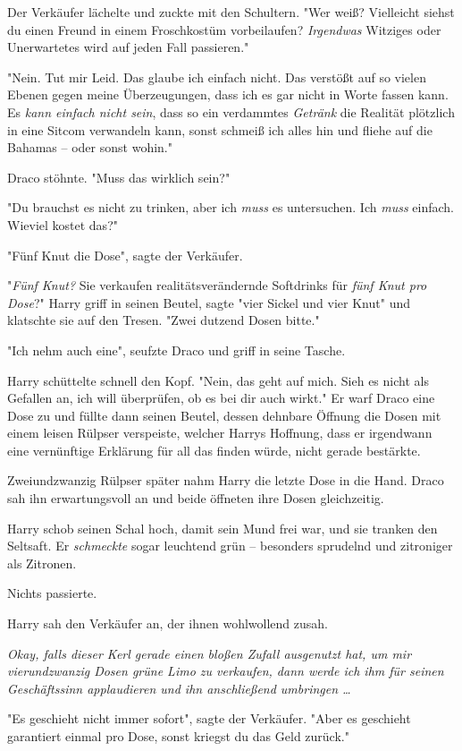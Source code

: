 {Der Verkäufer lächelte und zuckte mit den Schultern. "Wer weiß? Vielleicht siehst du einen Freund in einem Froschkostüm vorbeilaufen? \emph{Irgendwas} Witziges oder Unerwartetes wird auf jeden Fall passieren."

"Nein. Tut mir Leid. Das glaube ich einfach nicht. Das verstößt auf so vielen Ebenen gegen meine Überzeugungen, dass ich es gar nicht in Worte fassen kann. Es \emph{kann einfach nicht sein}, dass so ein verdammtes \emph{Getränk} die Realität plötzlich in eine Sitcom verwandeln kann, sonst schmeiß ich alles hin und fliehe auf die Bahamas -- oder sonst wohin."

Draco stöhnte. "Muss das wirklich sein?"

"Du brauchst es nicht zu trinken, aber ich \emph{muss} es untersuchen. Ich \emph{muss} einfach. Wieviel kostet das?"

"Fünf Knut die Dose", sagte der Verkäufer.

"\emph{Fünf Knut?} Sie verkaufen realitätsverändernde Softdrinks für \emph{fünf Knut pro Dose}?" Harry griff in seinen Beutel, sagte "vier Sickel und vier Knut" und klatschte sie auf den Tresen. "Zwei dutzend Dosen bitte."

"Ich nehm auch eine", seufzte Draco und griff in seine Tasche.

Harry schüttelte schnell den Kopf. "Nein, das geht auf mich. Sieh es nicht als Gefallen an, ich will überprüfen, ob es bei dir auch wirkt." Er warf Draco eine Dose zu und füllte dann seinen Beutel, dessen dehnbare Öffnung die Dosen mit einem leisen Rülpser verspeiste, welcher Harrys Hoffnung, dass er irgendwann eine vernünftige Erklärung für all das finden würde, nicht gerade bestärkte.

Zweiundzwanzig Rülpser später nahm Harry die letzte Dose in die Hand. Draco sah ihn erwartungsvoll an und beide öffneten ihre Dosen gleichzeitig.

Harry schob seinen Schal hoch, damit sein Mund frei war, und sie tranken den Seltsaft. Er \emph{schmeckte} sogar leuchtend grün -- besonders sprudelnd und zitroniger als Zitronen.

Nichts passierte.

Harry sah den Verkäufer an, der ihnen wohlwollend zusah.

\emph{Okay, falls dieser Kerl gerade einen bloßen Zufall ausgenutzt hat, um mir vierundzwanzig Dosen grüne Limo zu verkaufen, dann werde ich ihm für seinen Geschäftssinn applaudieren und ihn anschließend umbringen …}

"Es geschieht nicht immer sofort", sagte der Verkäufer. "Aber es geschieht garantiert einmal pro Dose, sonst kriegst du das Geld zurück."

}
